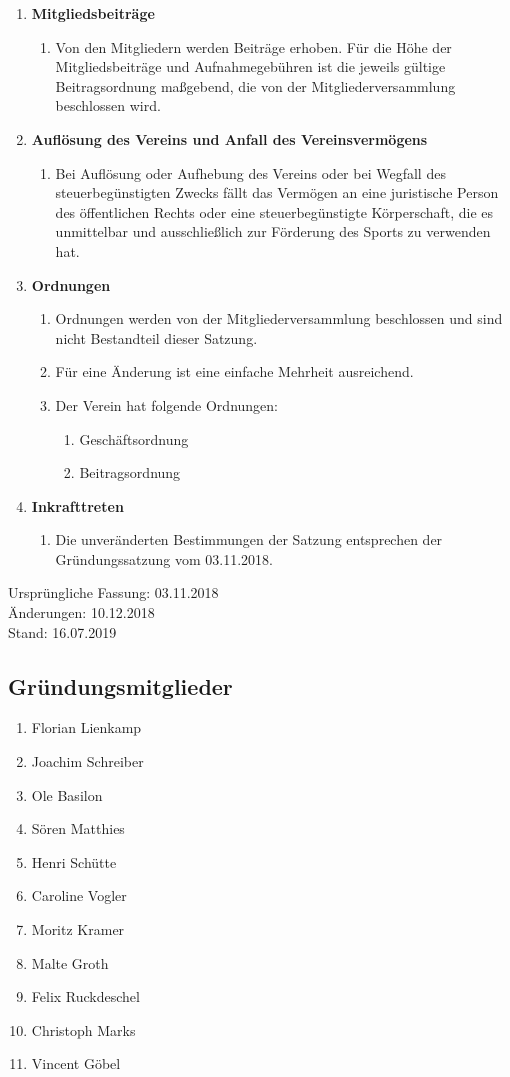 \documentclass{article}
\begin{document}
\begin{enumerate}[§ 1.]
\item \textsf{\textbf{Mitgliedsbeiträge}}
\begin{enumerate}
\item[] Von den Mitgliedern werden Beiträge erhoben. Für die Höhe der Mitgliedsbeiträge und Aufnahmegebühren ist die jeweils gültige Beitragsordnung maßgebend, die von der Mitgliederversammlung beschlossen wird.
\end{enumerate}

\item \textsf{\textbf{Auflösung des Vereins und Anfall des Vereinsvermögens}}
\begin{enumerate}
\item[] Bei Auflösung oder Aufhebung des Vereins oder bei Wegfall des steuerbegünstigten Zwecks fällt das Vermögen an eine juristische Person des öffentlichen Rechts oder eine steuerbegünstigte Körperschaft, die es unmittelbar und ausschließlich zur Förderung des Sports zu verwenden hat.
\end{enumerate}

\item \textsf{\textbf{Ordnungen}}
\begin{enumerate}
\item Ordnungen werden von der Mitgliederversammlung beschlossen und sind nicht Bestandteil dieser Satzung.
\item Für eine Änderung ist eine einfache Mehrheit ausreichend.
\item Der Verein hat folgende Ordnungen:
\begin{enumerate}
\item Geschäftsordnung
\item Beitragsordnung
\end{enumerate}
\end{enumerate}

\item \textsf{\textbf{Inkrafttreten}}
\begin{enumerate}
\item[] Die unveränderten Bestimmungen der Satzung entsprechen der Gründungssatzung vom 03.11.2018.
\end{enumerate}

\end{enumerate}
Ursprüngliche Fassung: 03.11.2018\\
Änderungen: 10.12.2018\\
Stand: 16.07.2019


\subsection*{Gründungsmitglieder}
\begin{enumerate}
\item Florian Lienkamp
\item Joachim Schreiber
\item Ole Basilon
\item Sören Matthies
\item Henri Schütte
\item Caroline Vogler
\item Moritz Kramer
\item Malte Groth
\item Felix Ruckdeschel
\item Christoph Marks
\item Vincent Göbel
\end{enumerate}
\end{document}
